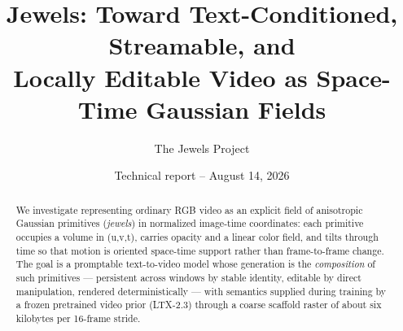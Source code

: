 \documentclass[10pt]{article}
\title{\vspace{-1.5em}\textbf{Jewels: Toward Text-Conditioned, Streamable, and\\Locally Editable Video as Space-Time Gaussian Fields}}
\author{The Jewels Project}
\date{Technical report -- August 14, 2026}
\newcommand{\uvt}{(u,v,t)}
\begin{document}
\maketitle
\vspace{-1.2em}
\begin{center}
\end{center}

\begin{abstract}
We investigate representing ordinary RGB video as an explicit field of anisotropic Gaussian
primitives (\emph{jewels}) in normalized image-time coordinates: each primitive occupies a
volume in \uvt, carries opacity and a linear color field, and tilts through time so that motion
is oriented space-time support rather than frame-to-frame change. The goal is a promptable
text-to-video model whose generation is the \emph{composition} of such primitives --- persistent
across windows by stable identity, editable by direct manipulation, rendered deterministically
--- with semantics supplied during training by a frozen pretrained video prior (LTX-2.3) through
a coarse scaffold raster of about six kilobytes per 16-frame stride.


\end{abstract}
\end{document}
